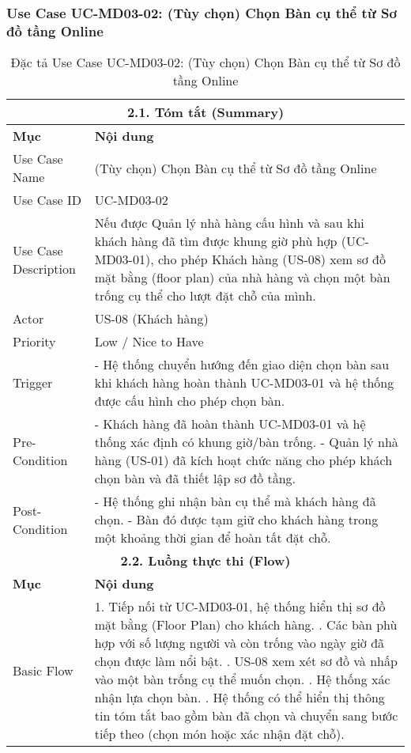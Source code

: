 \subsubsection{Use Case UC-MD03-02: (Tùy chọn) Chọn Bàn cụ thể từ Sơ đồ tầng Online}
\begin{longtable}{|m{4cm}|p{11cm}|}
\caption{Đặc tả Use Case UC-MD03-02: (Tùy chọn) Chọn Bàn cụ thể từ Sơ đồ tầng Online} \label{tab:uc_md03_02_revised_v3} \\
\hline
\multicolumn{2}{|c|}{\textbf{2.1. Tóm tắt (Summary)}} \\
\hline
\textbf{Mục} & \textbf{Nội dung} \\
\hline
\endhead %
\hline
\endfoot %
\hline
\endlastfoot %
Use Case Name & (Tùy chọn) Chọn Bàn cụ thể từ Sơ đồ tầng Online \\
\hline
Use Case ID & UC-MD03-02 \\
\hline
Use Case Description & Nếu được Quản lý nhà hàng cấu hình và sau khi khách hàng đã tìm được khung giờ phù hợp (UC-MD03-01), cho phép Khách hàng (US-08) xem sơ đồ mặt bằng (floor plan) của nhà hàng và chọn một bàn trống cụ thể cho lượt đặt chỗ của mình. \\
\hline
Actor & US-08 (Khách hàng) \\
\hline
Priority & Low / Nice to Have \\
\hline
Trigger & - Hệ thống chuyển hướng đến giao diện chọn bàn sau khi khách hàng hoàn thành UC-MD03-01 và hệ thống được cấu hình cho phép chọn bàn. \\
\hline
Pre-Condition & - Khách hàng đã hoàn thành UC-MD03-01 và hệ thống xác định có khung giờ/bàn trống. \newline - Quản lý nhà hàng (US-01) đã kích hoạt chức năng cho phép khách chọn bàn và đã thiết lập sơ đồ tầng. \\
\hline
Post-Condition & - Hệ thống ghi nhận bàn cụ thể mà khách hàng đã chọn. \newline - Bàn đó được tạm giữ cho khách hàng trong một khoảng thời gian để hoàn tất đặt chỗ. \\
\hline
\multicolumn{2}{|c|}{\textbf{2.2. Luồng thực thi (Flow)}} \\
\hline
\textbf{Mục} & \textbf{Nội dung} \\
\hline
Basic Flow & 1. Tiếp nối từ UC-MD03-01, hệ thống hiển thị sơ đồ mặt bằng (Floor Plan) cho khách hàng. \newline 2. Các bàn phù hợp với số lượng người và còn trống vào ngày giờ đã chọn được làm nổi bật. \newline 3. US-08 xem xét sơ đồ và nhấp vào một bàn trống cụ thể muốn chọn. \newline 4. Hệ thống xác nhận lựa chọn bàn. \newline 5. Hệ thống có thể hiển thị thông tin tóm tắt bao gồm bàn đã chọn và chuyển sang bước tiếp theo (chọn món hoặc xác nhận đặt chỗ). \\

\end{longtable}

